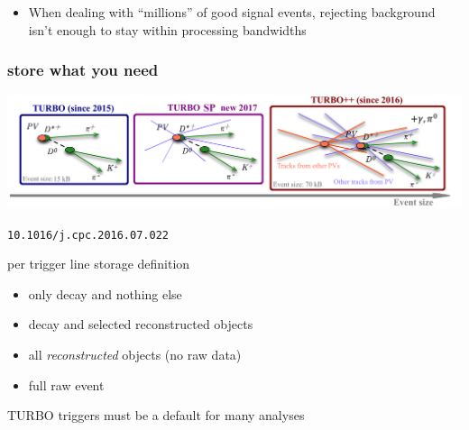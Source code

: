 \documentclass[table,xcolor=dvipsnames,professionalfonts]{beamer}
\begin{document}
\begin{frame}[t]
{\begin{itemize}
    \item When dealing with ``millions'' of good signal events, rejecting background isn't enough to stay within processing bandwidths
  \end{itemize}
}
\end{frame}

\begin{frame}
  \frametitle{store what you need}
  \includegraphics[width=\textwidth]{./turbosp.png}

  {\footnotesize{\texttt{10.1016/j.cpc.2016.07.022}}}
  
  \begin{block}{per trigger line storage definition}
  \begin{itemize}
      \item only decay and nothing else
      \item decay and selected reconstructed objects
      \item all \emph{reconstructed} objects (no raw data)
      \item full raw event
  \end{itemize}
  TURBO triggers must be a default for many analyses
  \end{block}
\end{frame}
\end{document}
